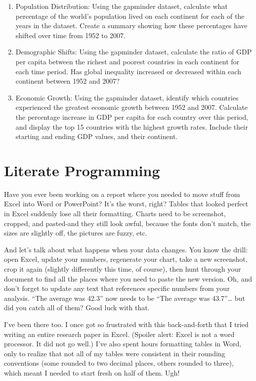 \documentclass[
  letterpaper,
]{book}
\begin{document}
\begin{enumerate}
\def\labelenumi{\arabic{enumi}.}
\setcounter{enumi}{4}
\item
  Population Distribution: Using the gapminder dataset, calculate what
  percentage of the world's population lived on each continent for each
  of the years in the dataset. Create a summary showing how these
  percentages have shifted over time from 1952 to 2007.
\item
  Demographic Shifts: Using the gapminder dataset, calculate the ratio
  of GDP per capita between the richest and poorest countries in each
  continent for each time period. Has global inequality increased or
  decreased within each continent between 1952 and 2007?
\item
  Economic Growth: Using the gapminder dataset, identify which countries
  experienced the greatest economic growth between 1952 and 2007.
  Calculate the percentage increase in GDP per capita for each country
  over this period, and display the top 15 countries with the highest
  growth rates. Include their starting and ending GDP values, and their
  continent.
\end{enumerate}


\chapter{Literate Programming}\label{sec-litprog}

Have you ever been working on a report where you needed to move stuff
from Excel into Word or PowerPoint? It's the worst, right? Tables that
looked perfect in Excel suddenly lose all their formatting. Charts need
to be screenshot, cropped, and pasted-and they still look awful, because
the fonts don't match, the sizes are slightly off, the pictures are
fuzzy, etc.

And let's talk about what happens when your data changes. You know the
drill: open Excel, update your numbers, regenerate your chart, take a
new screenshot, crop it again (slightly differently this time, of
course), then hunt through your document to find all the places where
you need to paste the new version. Oh, and don't forget to update any
text that references specific numbers from your analysis. ``The average
was 42.3'' now needs to be ``The average was 43.7''\ldots{} but did you
catch all of them? Good luck with that.

I've been there too. I once got so frustrated with this back-and-forth
that I tried writing an entire research paper in Excel. (Spoiler alert:
Excel is not a word processor. It did not go well.) I've also spent
hours formatting tables in Word, only to realize that not all of my
tables were consistent in their rounding conventions (some rounded to
two decimal places, others rounded to three), which meant I needed to
start fresh on half of them. Ugh!
\end{document}
